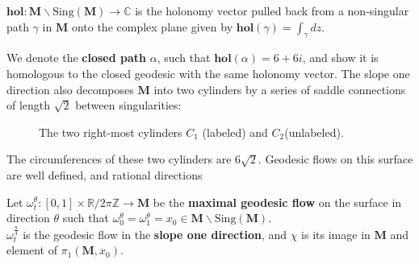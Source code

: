 \documentclass[]{article}
\begin{document}
\begin{Def}
$\mathbf{hol}:\mathbf{M}\backslash\text{Sing}(\mathbf{M})\rightarrow\mathbb{C}$ is the holonomy vector pulled back from a non-singular path $\gamma$ in $\mathbf{M}$ onto the complex plane given by $\mathbf{hol}(\gamma)=\int_{\gamma}dz$.
\end{Def}

We denote the \textbf{closed path} $\alpha$, such that $\mathbf{hol}(\alpha)=6+6i$, and show it is homologous to the closed geodesic with the same holonomy vector. The slope one direction also decomposes $\mathbf{M}$ into two cylinders by a series of saddle connections of length $\sqrt{2}$ between singularities:

\begin{figure}[H]
\centering

\caption{The two right-most cylinders $C_1$ (labeled) and $C_2$(unlabeled).}
\end{figure}

The circumferences of these two cylinders are $6\sqrt{2}$. Geodesic flows on this surface are well defined, and rational directions 

\begin{Def}
Let $\omega^{\theta}_t:[0,1]\times\mathbb{R}/2\pi\mathbb{Z}\rightarrow\mathbf{M}$ be the \textbf{maximal geodesic flow} on the surface in direction $\theta$ such that $\omega^{\theta}_0=\omega^{\theta}_1=x_0\in\mathbf{M}\backslash\text{Sing}(\mathbf{M})$.\\
$\omega^{\frac{\pi}{4}}_t$ is the geodesic flow in the \textbf{slope one direction}, and $\chi$ is its image in $\mathbf{M}$ and element of $\pi_1(\mathbf{M},x_0)$.
\end{Def}
\end{document}

